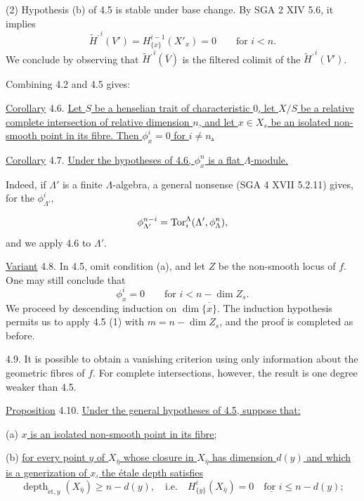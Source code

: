 (2) Hypothesis (b) of 4.5 is stable under base change. By SGA 2 XIV
5.6, it implies
\begin{equation*}
\widetilde H^{,i}(V')
=H^{i-1}_{\{x\}}(X'_x)=0
\qquad\text{for }i<n.
\end{equation*}
We conclude by observing that $\widetilde H^{,i}(\bar V)$ is the
filtered colimit of the $\widetilde H^{,i}(V')$.

Combining 4.2 and 4.5 gives:

\underline{Corollary} 4.6. \underline{Let $S$ be a henselian trait of
characteristic $0$, let $X/S$ be a relative complete intersection of
relative dimension $n$, and let $x\in X_s$ be an isolated non-smooth
point in its fibre. Then $\phi^i_x=0$ for $i\ne n$.}

\underline{Corollary} 4.7. \underline{Under the hypotheses of 4.6,
$\phi^n_x$ is a flat $\Lambda$-module.}

Indeed, if $\Lambda'$ is a finite $\Lambda$-algebra, a general nonsense
(SGA 4 XVII 5.2.11) gives, for the $\phi^i_{\Lambda'}$,


\begin{equation*}
\phi^{n-i}_{\Lambda'}
=\operatorname{Tor}_i^\Lambda(\Lambda',\phi^n_\Lambda),
\end{equation*}
and we apply 4.6 to $\Lambda'$.

\underline{Variant} 4.8. In 4.5, omit condition (a), and let $Z$ be the
non-smooth locus of $f$. One may still conclude that
\begin{equation*}
\phi^i_x=0\qquad\text{for }i<n-\dim Z_s.
\end{equation*}
We proceed by descending induction on $\dim\overline{\{x\}}$. The
induction hypothesis permits us to apply 4.5 (1) with
$m=n-\dim Z_s$, and the proof is completed as before.

4.9. It is possible to obtain a vanishing criterion using only
information about the geometric fibres of $f$. For complete
intersections, however, the result is one degree weaker than 4.5.

\underline{Proposition} 4.10. \underline{Under the general hypotheses
of 4.5, suppose that:}

(a) \underline{$x$ is an isolated non-smooth point in its fibre;}

(b) \underline{for every point $y$ of $X_{\bar\eta}$ whose closure in
$X_{\bar\eta}$ has dimension $d(y)$ and which is a generization of $x$,
the \'{e}tale depth satisfies}
\begin{equation*}
\operatorname{depth}_{\mathrm{\acute{e}t},y}(X_{\bar\eta})
\geqslant n-d(y),
\quad\text{i.e.}\quad
H^i_{\{y\}}(X_{\bar\eta})=0
\quad\underline{\text{for }}i\leqslant n-d(y);
\end{equation*}

